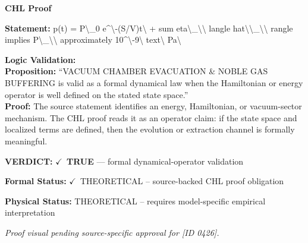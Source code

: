 \vspace{0.45em}
\noindent\textbf{CHL Proof}\par
\textbf{Statement:} p(t) = P\textbackslash{}\_0 e\textasciicircum{}\textbackslash{}-(S/V)t\textbackslash{} + sum eta\textbackslash{}\_\textbackslash{}\textbackslash{} langle hat\textbackslash{}\textbackslash{}\_\textbackslash{}\textbackslash{} rangle implies P\textbackslash{}\_\textbackslash{}\textbackslash{} approximately
10\textasciicircum{}\textbackslash{}-9\textbackslash{} text\textbackslash{} Pa\textbackslash{}

\textbf{Logic Validation:}\\
\textbf{Proposition:} ``VACUUM CHAMBER EVACUATION \& NOBLE GAS BUFFERING is valid as a formal dynamical law when
the Hamiltonian or energy operator is well defined on the stated state space.''\\
\textbf{Proof:} The source statement identifies an energy, Hamiltonian, or vacuum-sector mechanism. The
CHL proof reads it as an operator claim: if the state space and localized terms are
defined, then the evolution or extraction channel is formally meaningful.

\textbf{VERDICT:} \ensuremath{\checkmark}\ \textbf{TRUE} --- formal dynamical-operator validation

\textbf{Formal Status:} \ensuremath{\checkmark}\ THEORETICAL -- source-backed CHL proof obligation

\textbf{Physical Status:} THEORETICAL -- requires model-specific empirical interpretation
\par\vspace{0.45em}
\par
\vfill
\begingroup\footnotesize\itshape
Proof visual pending source-specific approval for [ID 0426].
\par\endgroup
\vfill
\endgroup
\endgroup
